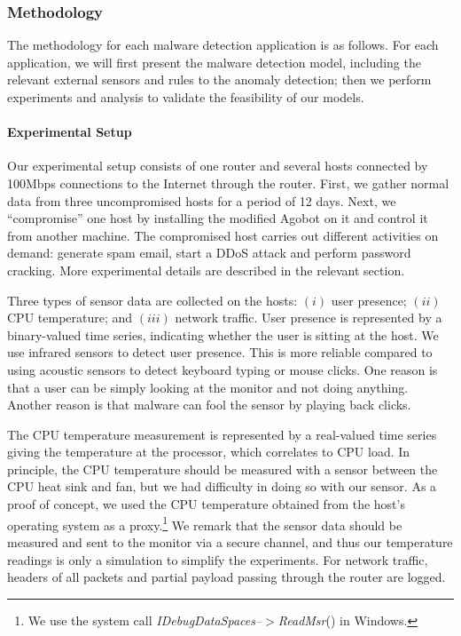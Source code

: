 \subsubsection{Methodology}

The methodology for each malware detection application is as follows.  For each
application, we will first present the malware detection model, including the
relevant external sensors and rules to the anomaly detection; then we perform
experiments and analysis to validate the feasibility of our models.

\paragraph{Experimental Setup}
Our experimental setup consists
of one router and
several hosts connected by 100Mbps connections to the Internet
through the router. First, we gather normal data from three
uncompromised hosts for a period of 12 days. Next, we ``compromise''
one host by installing the modified Agobot on it and control it from
another machine. The compromised host carries out
different activities on demand: generate spam email, start a DDoS
attack and perform password cracking.
More experimental details are described in the relevant section.

Three types of sensor data are collected on the hosts: $(i)$
user presence; $(ii)$ CPU temperature; and $(iii)$ network traffic.
User presence is represented by a binary-valued time series,
indicating whether the user is sitting at the host.
We use infrared sensors to detect user presence.
This is more reliable compared
to using acoustic sensors to detect keyboard typing or mouse clicks.
One reason is that a user can be simply looking at the monitor and not
doing anything.
Another reason is that malware can fool the sensor by playing back clicks.

The CPU temperature measurement
is represented by a real-valued time series giving the
temperature at the processor, which correlates to CPU load. In
principle, the CPU temperature should be measured with a sensor
between the CPU heat sink and fan, but we had difficulty in doing so
with our sensor. As a proof of concept, we used the CPU
temperature obtained from the host's operating system as a
proxy.\footnote{We use the
system call \emph{IDebugDataSpaces--$>$ReadMsr}() in Windows.
}
We remark that the sensor data should be measured and sent to the
monitor via a secure channel, and thus our temperature readings
is only a simulation to simplify the experiments.
For network traffic, headers of all packets and partial payload
passing through the router are logged.

